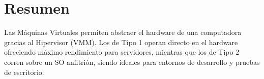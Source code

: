 \documentclass{article}
\begin{document}
\section{Resumen}
\label{sec:orgb8e9c84}
Las Máquinas Virtuales permiten abstraer el hardware de una
computadora gracias al Hipervisor (VMM). Los de Tipo 1 operan directo
en el hardware ofreciendo máximo rendimiento para servidores, mientras
que los de Tipo 2 corren sobre un SO anfitrión, siendo ideales para
entornos de desarrollo y pruebas de escritorio.
\end{document}
